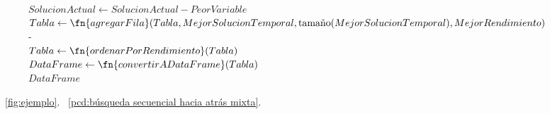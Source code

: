 \documentclass[conference,a4paper]{IEEEtran}
\begin{document}
\begin{figure}
\begin{pseudo}
        \( SolucionActual \leftarrow SolucionActual - PeorVariable \) \\
        \( Tabla \leftarrow \fn{agregarFila}(Tabla, MejorSolucionTemporal, \textnormal{tamaño}(MejorSolucionTemporal), MejorRendimiento) \) \\-
    \fin \\

    \( Tabla \leftarrow \fn{ordenarPorRendimiento}(Tabla) \) \\
    \( DataFrame \leftarrow \fn{convertirADataFrame}(Tabla) \) \\

    \devolver \( DataFrame \) \\
  \end{pseudo}
\end{figure}

\figurename~\ref{fig:ejemplo}.
\figurename~\ref{pcd:búsqueda secuencial hacia atrás mixta}.
\end{document}
